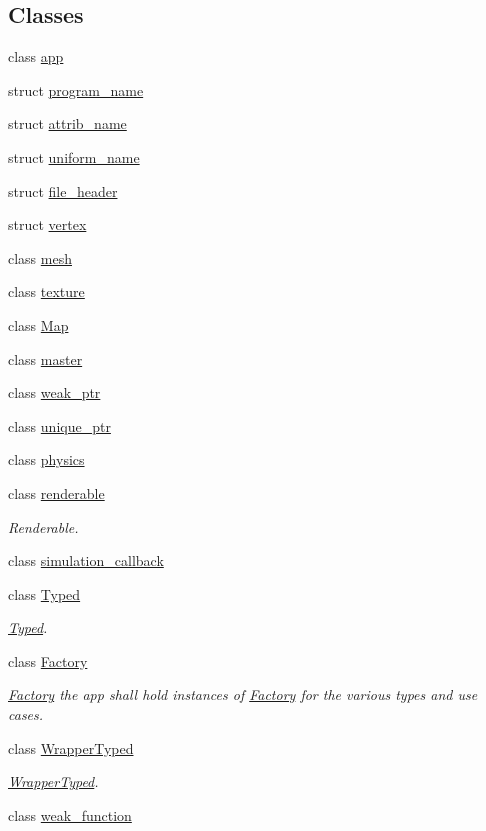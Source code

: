 \subsection*{\-Classes}
\begin{DoxyCompactItemize}
\item 
class \hyperlink{classNeb_1_1app}{app}
\item 
struct \hyperlink{structNeb_1_1program__name}{program\-\_\-name}
\item 
struct \hyperlink{structNeb_1_1attrib__name}{attrib\-\_\-name}
\item 
struct \hyperlink{structNeb_1_1uniform__name}{uniform\-\_\-name}
\item 
struct \hyperlink{structNeb_1_1file__header}{file\-\_\-header}
\item 
struct \hyperlink{structNeb_1_1vertex}{vertex}
\item 
class \hyperlink{classNeb_1_1mesh}{mesh}
\item 
class \hyperlink{classNeb_1_1texture}{texture}
\item 
class \hyperlink{classNeb_1_1Map}{\-Map}
\item 
class \hyperlink{classNeb_1_1master}{master}
\item 
class \hyperlink{classNeb_1_1weak__ptr}{weak\-\_\-ptr}
\item 
class \hyperlink{classNeb_1_1unique__ptr}{unique\-\_\-ptr}
\item 
class \hyperlink{classNeb_1_1physics}{physics}
\item 
class \hyperlink{classNeb_1_1renderable}{renderable}
\begin{DoxyCompactList}\small\item\em \-Renderable. \end{DoxyCompactList}\item 
class \hyperlink{classNeb_1_1simulation__callback}{simulation\-\_\-callback}
\item 
class \hyperlink{classNeb_1_1Typed}{\-Typed}
\begin{DoxyCompactList}\small\item\em \hyperlink{classNeb_1_1Typed}{\-Typed}. \end{DoxyCompactList}\item 
class \hyperlink{classNeb_1_1Factory}{\-Factory}
\begin{DoxyCompactList}\small\item\em \hyperlink{classNeb_1_1Factory}{\-Factory} the app shall hold instances of \hyperlink{classNeb_1_1Factory}{\-Factory} for the various types and use cases. \end{DoxyCompactList}\item 
class \hyperlink{classNeb_1_1WrapperTyped}{\-Wrapper\-Typed}
\begin{DoxyCompactList}\small\item\em \hyperlink{classNeb_1_1WrapperTyped}{\-Wrapper\-Typed}. \end{DoxyCompactList}\item 
class \hyperlink{classNeb_1_1weak__function}{weak\-\_\-function}
\end{DoxyCompactItemize}
